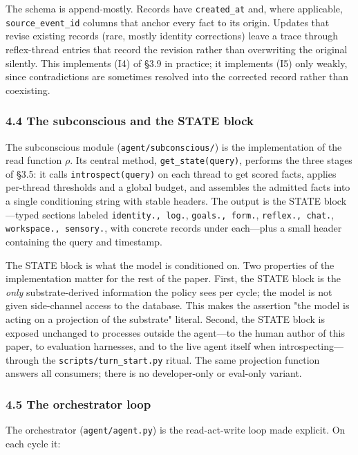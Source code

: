 \documentclass[11pt,letterpaper]{article}
\begin{document}
The schema is append-mostly. Records have \texttt{created\_at} and, where applicable, \texttt{source\_event\_id} columns that anchor every fact to its origin. Updates that revise existing records (rare, mostly identity corrections) leave a trace through reflex-thread entries that record the revision rather than overwriting the original silently. This implements (I4) of §3.9 in practice; it implements (I5) only weakly, since contradictions are sometimes resolved into the corrected record rather than coexisting.

\subsubsection*{4.4 The subconscious and the STATE block}

The subconscious module (\texttt{agent/subconscious/}) is the implementation of the read function $\rho$. Its central method, \texttt{get\_state(query)}, performs the three stages of §3.5: it calls \texttt{introspect(query)} on each thread to get scored facts, applies per-thread thresholds and a global budget, and assembles the admitted facts into a single conditioning string with stable headers. The output is the STATE block---typed sections labeled \texttt{identity.\emph{}, \texttt{log.}}, \texttt{goals.\emph{}, \texttt{form.}}, \texttt{reflex.\emph{}, \texttt{chat.}}, \texttt{workspace.\emph{}, \texttt{sensory.}}, with concrete records under each---plus a small header containing the query and timestamp.

The STATE block is what the model is conditioned on. Two properties of the implementation matter for the rest of the paper. First, the STATE block is the \emph{only} substrate-derived information the policy sees per cycle; the model is not given side-channel access to the database. This makes the assertion "the model is acting on a projection of the substrate" literal. Second, the STATE block is exposed unchanged to processes outside the agent---to the human author of this paper, to evaluation harnesses, and to the live agent itself when introspecting---through the \texttt{scripts/turn\_start.py} ritual. The same projection function answers all consumers; there is no developer-only or eval-only variant.

\subsubsection*{4.5 The orchestrator loop}

The orchestrator (\texttt{agent/agent.py}) is the read-act-write loop made explicit. On each cycle it:
\end{document}
